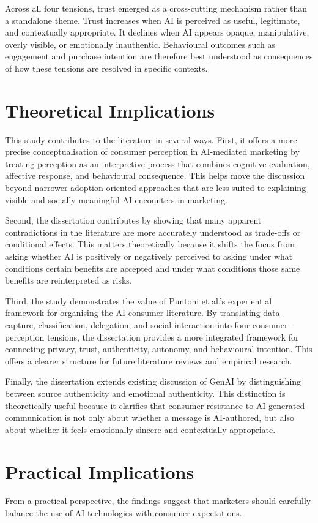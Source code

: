 Across all four tensions, trust emerged as a cross-cutting mechanism rather than a standalone theme. Trust increases when AI is perceived as useful, legitimate, and contextually appropriate. It declines when AI appears opaque, manipulative, overly visible, or emotionally inauthentic. Behavioural outcomes such as engagement and purchase intention are therefore best understood as consequences of how these tensions are resolved in specific contexts.

\section{Theoretical Implications}
This study contributes to the literature in several ways. First, it offers a more precise conceptualisation of consumer perception in AI-mediated marketing by treating perception as an interpretive process that combines cognitive evaluation, affective response, and behavioural consequence. This helps move the discussion beyond narrower adoption-oriented approaches that are less suited to explaining visible and socially meaningful AI encounters in marketing.

Second, the dissertation contributes by showing that many apparent contradictions in the literature are more accurately understood as trade-offs or conditional effects. This matters theoretically because it shifts the focus from asking whether AI is positively or negatively perceived to asking under what conditions certain benefits are accepted and under what conditions those same benefits are reinterpreted as risks.

Third, the study demonstrates the value of Puntoni et al.'s experiential framework for organising the AI-consumer literature. By translating data capture, classification, delegation, and social interaction into four consumer-perception tensions, the dissertation provides a more integrated framework for connecting privacy, trust, authenticity, autonomy, and behavioural intention. This offers a clearer structure for future literature reviews and empirical research.

Finally, the dissertation extends existing discussion of GenAI by distinguishing between source authenticity and emotional authenticity. This distinction is theoretically useful because it clarifies that consumer resistance to AI-generated communication is not only about whether a message is AI-authored, but also about whether it feels emotionally sincere and contextually appropriate.

\section{Practical Implications}
From a practical perspective, the findings suggest that marketers should carefully balance the use of AI technologies with consumer expectations.

